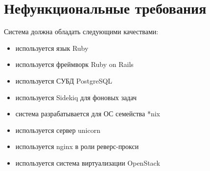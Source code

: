\section{Нефункциональные требования}\label{sec:ch2/sec3}
Система должна обладать следующими качествами:
\begin{itemize}
  \item используется язык Ruby
  \item используется фреймворк Ruby on Rails
  \item используется СУБД PostgreSQL
  \item используется Sidekiq для фоновых задач
  \item система разрабатывается для ОС семейства *nix
  \item используется сервер unicorn
  \item используется nginx в роли реверс-прокси
  \item используется система виртуализации OpenStack
\end{itemize}
